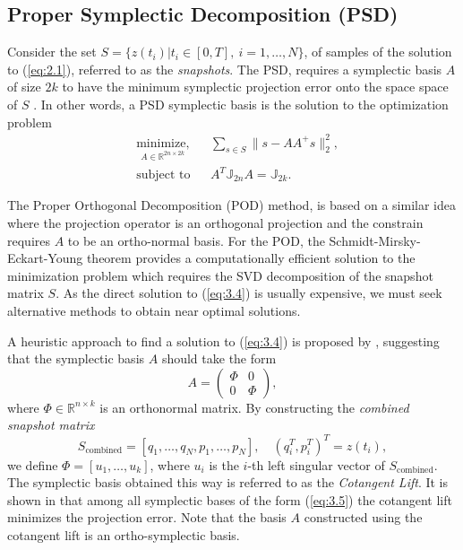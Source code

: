 \subsection{Proper Symplectic Decomposition (PSD)} Consider the set $S = \{z(t_i)| t_i\in[0,T],\ i=1,\dots,N\}$, of samples of the solution to (\ref{eq:2.1}), referred to as the \emph{snapshots}. The PSD, requires a symplectic basis $A$ of size $2k$ to have the minimum symplectic projection error onto the space space of $S$ . In other words, a PSD symplectic basis is the solution to the optimization problem
\begin{equation} \label{eq:3.4}
	\begin{aligned}
	& \underset{A \in \mathbb R^{2n\times 2k}}{\text{minimize}, }
	& & \sum_{s\in S} \| s - AA^+s\|_2^2, \\
	& \text{subject to}
	& & A^T \mathbb{J}_{2n}A = \mathbb{J}_{2k}.
	\end{aligned}
\end{equation}

The Proper Orthogonal Decomposition (POD) \cite{hesthaven2015certified,quarteroni2015reduced} method, is based on a similar idea where the projection operator is an orthogonal projection and the constrain requires $A$ to be an ortho-normal basis. For the POD, the Schmidt-Mirsky-Eckart-Young theorem \cite{Markovsky:2011:LRA:2103589} provides a computationally efficient solution to the minimization problem which requires the SVD decomposition of the snapshot matrix $S$. As the direct solution to (\ref{eq:3.4}) is usually expensive, we must seek alternative methods to obtain near optimal solutions.

A heuristic approach to find a solution to (\ref{eq:3.4}) is proposed by \cite{Peng:2014di}, suggesting that the symplectic basis $A$ should take the form
\begin{equation} \label{eq:3.5}
	A = 
	\begin{pmatrix}
		\Phi & 0 \\
		0 & \Phi
	\end{pmatrix},
\end{equation}
where $\Phi \in \mathbb{R}^{n\times k}$ is an orthonormal matrix. By constructing the \emph{combined snapshot matrix}
\begin{equation} \label{eq:3.6}
	S_{\text{combined}} = [q_1,\dots,q_N,p_1,\dots,p_N], \quad (q_i^T,p_i^T)^T = z(t_i),
\end{equation}
we define $\Phi=[u_1,\dots,u_k]$, where $u_i$ is the $i$-th left singular vector of $S_{\text{combined}}$. The symplectic basis obtained this way is referred to as the \emph{Cotangent Lift}. It is shown in \cite{Peng:2014di} that among all symplectic bases of the form (\ref{eq:3.5}) the cotangent lift minimizes the projection error. Note that the basis $A$ constructed using the cotangent lift is an ortho-symplectic basis.

